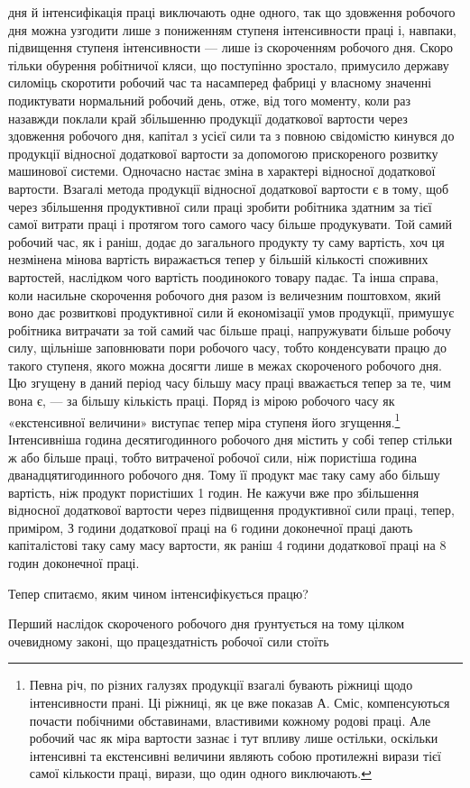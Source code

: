 \parcont{}  %
дня й інтенсифікація праці виключають одне одного, так що
здовження робочого дня можна узгодити лише з пониженням
ступеня інтенсивности праці і, навпаки, підвищення ступеня інтенсивности
— лише із скороченням робочого дня. Скоро тільки
обурення робітничої кляси, що поступінно зростало, примусило
державу силоміць скоротити робочий час та насамперед фабриці
у власному значенні подиктувати нормальний робочий день,
отже, від того моменту, коли раз назавжди поклали край збільшенню
продукції додаткової вартости через здовження робочого
дня, капітал з усієї сили та з повною свідомістю кинувся до продукції
відносної додаткової вартости за допомогою прискореного
розвитку машинової системи. Одночасно настає зміна в характері
відносної додаткової вартости. Взагалі метода продукції відносної
додаткової вартости є в тому, щоб через збільшення продуктивної
сили праці зробити робітника здатним за тієї самої витрати праці
і протягом того самого часу більше продукувати. Той самий
робочий час, як і раніш, додає до загального продукту ту саму
вартість, хоч ця незмінена мінова вартість виражається тепер у
більшій кількості споживних вартостей, наслідком чого вартість
поодинокого товару падає. Та інша справа, коли насильне скорочення
робочого дня разом із величезним поштовхом, який воно
дає розвиткові продуктивної сили й економізації умов продукції,
примушує робітника витрачати за той самий час більше праці,
напружувати більше робочу силу, щільніше заповнювати пори
робочого часу, тобто конденсувати працю до такого ступеня, якого
можна досягти лише в межах скороченого робочого дня. Цю
згущену в даний період часу більшу масу праці вважається тепер
за те, чим вона є, — за більшу кількість праці. Поряд із мірою
робочого часу як «екстенсивної величини» виступає тепер міра
ступеня його згущення.\footnote{
Певна річ, по різних галузях продукції взагалі бувають ріжниці
щодо інтенсивности прані. Ці ріжниці, як це вже показав А. Сміс, компенсуються
почасти побічними обставинами, властивими кожному родові
праці. Але робочий час як міра вартости зазнає і тут впливу лише остільки,
оскільки інтенсивні та екстенсивні величини являють собою протилежні
вирази тієї самої кількости праці, вирази, що один одного виключають.
} Інтенсивніша година десятигодинного
робочого дня містить у собі тепер стільки ж або більше праці,
тобто витраченої робочої сили, ніж пористіша година дванадцятигодинного
робочого дня. Тому її продукт має таку саму або більшу
вартість, ніж продукт пористіших 1 годин. Не кажучи вже про
збільшення відносної додаткової вартости через підвищення продуктивної
сили праці, тепер, приміром, З  години додаткової
праці на 6 години доконечної праці дають капіталістові таку
саму масу вартости, як раніш 4 години додаткової праці на 8 годин
доконечної праці.

Тепер спитаємо, яким чином інтенсифікується працю?

Перший наслідок скороченого робочого дня ґрунтується на тому
цілком очевидному законі, що працездатність робочої сили стоїть
\parbreak{}  %
